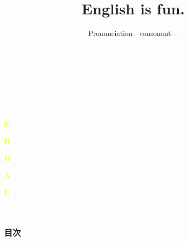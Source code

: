 \documentclass[aspectratio=169,xcolor={dvipsnames,table}]{beamer}
\title{English is fun.}
\subtitle{Pronunciation---consonant---}
\author{}
\institute[]{}
\date[]
\makeatletter
\newcommand*{\themonth}{\two@digits\month}
\newcommand*{\theday}{\two@digits\day}
\newcommand{\mytoday}{{\the\year}--{\themonth}--{\theday}}
\makeatother
\begin{document}
\begin{frame}
  \raggedleft
  \textcolor{white}{\Huge\bfseries English is fun.}

  \vfill

  \raggedleft
  \textcolor{white}{\LARGE\bfseries \mytoday}

  \vfill
  \vfill
  \vfill

  \raggedleft
  \textcolor{white}{\large The lesson will begin at the scheduled time.}


  \hyperlink{today}{}

\end{frame}

\begin{frame}
  \raggedleft
  \textcolor{white}{\Huge\bfseries \textcolor{yellow}{E}nglish is fun.}

  \vfill

  \vfill

  \raggedleft
  \textcolor{white}{\LARGE\bfseries \textcolor{yellow}{H}ello, everybody!}

  \textcolor{white}{\LARGE\bfseries \textcolor{yellow}{H}ow are you today?}

  \raggedleft
  \textcolor{white}{\LARGE\bfseries \textcolor{yellow}{A}re you ready to start?}

  \textcolor{white}{\LARGE\bfseries \textcolor{yellow}{L}et's begin today's lesson.}

  \vfill

  \raggedleft
  \textcolor{white}{\Large \bfseries \mytoday}

  \hyperlink{today}{}

\end{frame}
\begin{frame}
  \frametitle{目次}
  \tableofcontents
\end{frame}
\end{document}

